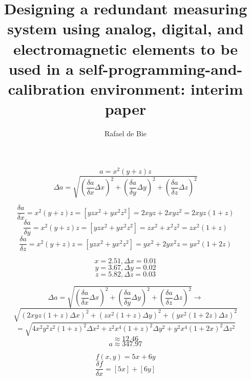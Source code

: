 \documentclass[11pt]{article} %
\title{Designing a redundant measuring system using analog, digital, and electromagnetic elements to be used in a self-programming-and-calibration environment: interim paper}
\author{Rafael de Bie}
\begin{document}
$$a = x^2(y+z)z$$
$$\Delta a = \sqrt{\left(\frac{\delta a}{\delta x} \Delta x\right)^2 + \left(\frac{\delta a}{\delta y} \Delta y\right)^2 + \left(\frac{\delta a}{\delta z} \Delta z\right)^2}$$

$$\frac{\delta a}{\delta x} = x^2(y+z)z = \left[yzx^2 + yx^2z^2\right] = 2xyz + 2xyz^2 = 2xyz(1+z)$$
$$\frac{\delta a}{\delta y} = x^2(y+z)z = \left[yzx^2 + yx^2z^2\right] = zx^2 + x^2z^2 = zx^2(1+z)$$
$$\frac{\delta a}{\delta z} = x^2(y+z)z = \left[yzx^2 + yx^2z^2\right] = yx^2 + 2yx^2z = yx^2(1+2z)$$

$$x = 2.51, \Delta x = 0.01$$
$$y = 3.67, \Delta y = 0.02$$
$$z = 5.82, \Delta z = 0.03$$

$$\Delta a = \sqrt{\left(\frac{\delta a}{\delta x} \Delta x\right)^2 + \left(\frac{\delta a}{\delta y} \Delta y\right)^2 + \left(\frac{\delta a}{\delta z} \Delta z\right)^2} \rightarrow $$
$$\sqrt{ (2xyz(1+z)\Delta x)^2 + (zx^2(1+z) \Delta y)^2 + (yx^2(1+2z) \Delta z)^2 }$$
$$ = \sqrt{ 4x^2y^2z^2(1+z)^2 \Delta x^2 + z^2x^4(1+z)^2 \Delta y^2 + y^2x^4(1+2x)^2 \Delta z^2 } $$
$$\approx 12.46$$
$$a \approx 347.97$$

$$f(x,y) = 5x + 6y$$
$$\frac{\delta f}{\delta x} = [5x] + [6y]$$
\end{document}
